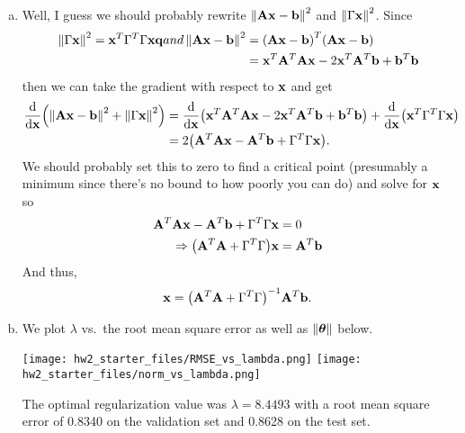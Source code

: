 \documentclass[12pt,letterpaper]{hmcpset}
\begin{document}
\begin{solution}
\begin{enumerate}[(a)]
		\item Well, I guess we should probably rewrite $\left\lVert\vb A \vb x - \vb b\right\rVert^2$ and $\left\lVert\Gamma \vb x\right\rVert^2$. Since
		\begin{align*}
			\left\lVert\Gamma \vb x\right\rVert^2 = \vb x^T \Gamma^T \Gamma \vb x {\bf q}{and} \left\lVert\vb A \vb x - \vb b\right\rVert^2 &= \qty(\vb A \vb x - \vb b)^T \qty(\vb A \vb x - \vb b) \\
			&= \vb x^T \vb A^T \vb A \vb x - 2 \vb x^T \vb A^T \vb b + \vb b^T \vb b 
		\end{align*}
		then we can take the gradient with respect to $\vb x$ and get
		\begin{align*}
			\dv{\vb x}\qty(\left\lVert\vb A \vb x - \vb b\right\rVert^2 + \left\lVert\Gamma \vb x\right\rVert^2 ) &= \dv{\vb x}\qty(\vb x^T \vb A^T \vb A \vb x - 2 \vb x^T \vb A^T \vb b + \vb b^T \vb b ) + \dv{\vb x}\qty(\vb x^T \Gamma^T \Gamma \vb x )\\
			&= 2 \qty(\vb A^T \vb A \vb x - \vb A^T \vb b + \Gamma^T \Gamma \vb x).
		\end{align*}
		We should probably set this to zero to find a critical point (presumably a minimum since there's no bound to how poorly you can do) and solve for $\vb x$ so
		\begin{align*}
		\vb A^T \vb A \vb x - \vb A^T \vb b + \Gamma^T \Gamma \vb x &= 0 \\
		\Rightarrow 
		\qty(\vb A^T \vb A  + \Gamma^T \Gamma )\vb x &=  \vb A^T \vb b 
		\end{align*}
		And thus, 
		\begin{align*}
			\vb x = \qty(\vb A^T \vb A  + \Gamma^T \Gamma )^{-1}\vb A^T \vb b .
		\end{align*}

		\item We plot $\lambda$ vs.\ the root mean square error as well as $\left\lVert\hbox{\boldmath$\theta$}\right\rVert$ below. 
		\begin{center}
			\texttt{[image: hw2\_starter\_files/RMSE\_vs\_lambda.png]}
			\texttt{[image: hw2\_starter\_files/norm\_vs\_lambda.png]}
		\end{center}

		The optimal regularization value was $\lambda = 8.4493$ with a root mean square error of 0.8340 on the validation set and 0.8628 on the test set.


\end{enumerate}
\end{solution}
\end{document}
